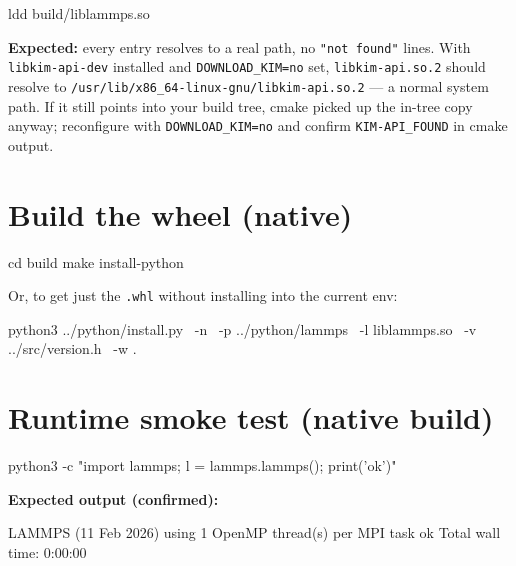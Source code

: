 \documentclass[11pt]{article}
\begin{document}
\begin{codebox}
ldd build/liblammps.so
\end{codebox}

\textbf{Expected:} every entry resolves to a real path, no
\texttt{"not found"} lines.  With \texttt{libkim-api-dev} installed and
\texttt{DOWNLOAD\_KIM=no} set, \texttt{libkim-api.so.2} should resolve to
\texttt{/usr/lib/x86\_64-linux-gnu/libkim-api.so.2} --- a normal system path.
If it still points into your build tree, cmake picked up the in-tree copy
anyway; reconfigure with \texttt{DOWNLOAD\_KIM=no} and confirm
\texttt{KIM-API\_FOUND} in cmake output.

\section{Build the wheel (native)}

\begin{codebox}
cd build
make install-python
\end{codebox}

Or, to get just the \texttt{.whl} without installing into the current env:

\begin{codebox}
python3 ../python/install.py \
    -n \
    -p ../python/lammps \
    -l liblammps.so \
    -v ../src/version.h \
    -w .
\end{codebox}

\section{Runtime smoke test (native build)}

\begin{codebox}
python3 -c "import lammps; l = lammps.lammps(); print('ok')"
\end{codebox}

\textbf{Expected output (confirmed):}

\begin{codebox}[]
LAMMPS (11 Feb 2026)
  using 1 OpenMP thread(s) per MPI task
ok
Total wall time: 0:00:00
\end{codebox}

\end{document}
